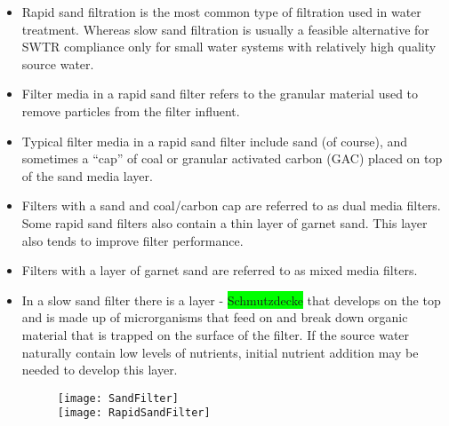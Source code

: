 \begin{itemize}
\item Rapid sand filtration is the most common type of filtration used in water treatment. Whereas slow sand filtration is usually a feasible alternative for SWTR compliance only for small water systems with relatively high quality source water.
\item Filter media in a rapid sand filter refers to the granular material used to remove particles from the filter influent. 
\item Typical filter media in a rapid sand filter include sand (of course), and sometimes a “cap” of coal or granular activated carbon (GAC) placed on top of the sand media layer. 
\item Filters with a sand and coal/carbon cap are referred to as dual media filters. Some rapid sand filters also contain a thin layer of garnet sand. This layer also tends to improve filter performance.  
\item Filters with a layer of garnet sand are referred to as mixed media filters.
\item In a slow sand filter there is a  layer - \colorbox{lime}{Schmutzdecke} that develops on the top and is made up of microrganisms that feed on and break down organic material that is trapped on the surface of the filter. If the source water naturally contain low levels of nutrients, initial nutrient addition may be needed to develop this layer.

\begin{figure}[h]
\begin{center}
\texttt{[image: SandFilter]}\\
\vspace{0.3cm}
\texttt{[image: RapidSandFilter]}\\
\end{center}
\end{figure}
\end{itemize}


